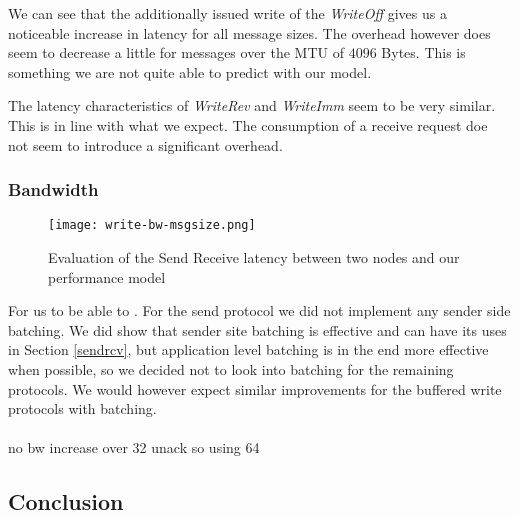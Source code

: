 We can see that the additionally issued write of the \emph{WriteOff} gives us a noticeable increase in latency for all message
sizes. The overhead however does seem to decrease a little for messages over the MTU of $4096$ Bytes. This is something we are
not quite able to predict with our model.

The latency characteristics of \emph{WriteRev} and \emph{WriteImm} seem to be very similar. This is in line with what we 
expect. The consumption of a receive request doe not seem to introduce a significant overhead. 

\subsubsection{Bandwidth}

\begin{figure}[h]
\texttt{[image: write-bw-msgsize.png]}
\caption{Evaluation of the Send Receive latency between two nodes and our performance model}
\label{fig:plot-write-bw-unack}
\end{figure}

For us to be able to . For the send protocol 
we did not implement any sender side batching. We did show that sender site batching is effective and can have its uses in 
Section \ref{sendrcv}, but application level batching is in the end more effective when possible, so we decided not to look 
into batching for the remaining protocols. We would however expect similar improvements for the buffered write 
protocols with batching.

\paragraph{}no bw increase over 32 unack so using 64


\subsection{Conclusion}








